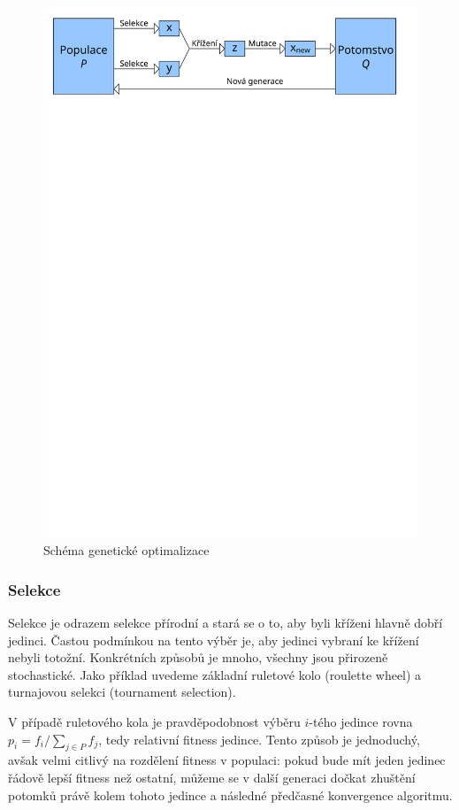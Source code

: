 \begin{figure}[h!]
  \includegraphics[width=\textwidth]{img/EA}
  \caption{Schéma genetické optimalizace}\label{EA fig}
\end{figure}

\subsubsection{Selekce}

Selekce je odrazem selekce přírodní a stará se o to, aby byli kříženi hlavně dobří jedinci. Častou podmínkou na tento výběr je, aby jedinci vybraní ke křížení nebyli totožní. Konkrétních způsobů je mnoho, všechny jsou přirozeně stochastické. Jako příklad uvedeme základní ruletové kolo (roulette wheel) a turnajovou selekci (tournament selection).

V případě ruletového kola je pravděpodobnost výběru $i$-tého jedince rovna $p_i = f_i/\sum_{j \in P} f_j$, tedy relativní fitness jedince. Tento způsob je jednoduchý, avšak velmi citlivý na rozdělení fitness v populaci: pokud bude mít jeden jedinec řádově lepší fitness než ostatní, můžeme se v další generaci dočkat zhuštění potomků právě kolem tohoto jedince a následné předčasné konvergence algoritmu.

